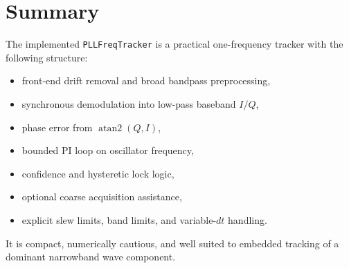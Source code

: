 \documentclass[conference]{IEEEtran}
\begin{document}
    \section{Summary}

    The implemented \texttt{PLLFreqTracker} is a practical one-frequency tracker
    with the following structure:
    \begin{itemize}[leftmargin=1.4em]
        \item front-end drift removal and broad bandpass preprocessing,
        \item synchronous demodulation into low-pass baseband \(I/Q\),
        \item phase error from \(\operatorname{atan2}(Q,I)\),
        \item bounded PI loop on oscillator frequency,
        \item confidence and hysteretic lock logic,
        \item optional coarse acquisition assistance,
        \item explicit slew limits, band limits, and variable-\(dt\) handling.
    \end{itemize}

    It is compact, numerically cautious, and well suited to embedded tracking of a
    dominant narrowband wave component.
\end{document}
